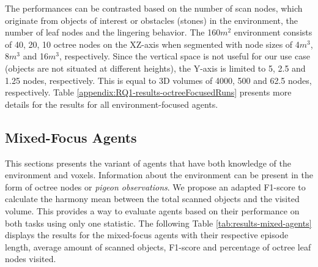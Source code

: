 The performances can be contrasted based on the number of scan nodes, which originate from objects of interest or obstacles (stones) in the environment, the number of leaf nodes and the lingering behavior. 
The 160$m^2$ environment consists of 40, 20, 10 octree nodes on the XZ-axis when segmented with node sizes of 4$m^3$, 8$m^3$ and 16$m^3$, respectively. Since the vertical space is not useful for our use case (objects are not situated at different heights), the Y-axis is limited to 5, 2.5 and 1.25 nodes, respectively. This is equal to 3D volumes of 4000, 500 and 62.5 nodes, respectively.
Table \ref{appendix:RQ1-results-octreeFocusedRuns} presents more details for the results for all environment-focused agents. 
% 




\subsection{Mixed-Focus Agents}
This sections presents the variant of agents that have both knowledge of the environment and voxels. Information about the environment can be present in the form of octree nodes or \textit{pigeon observations}. 
We propose an adapted F1-score \cite{f1score2022} to calculate the harmony mean between the total scanned objects and the visited volume. This provides a way to evaluate agents based on their performance on both tasks using only one statistic. 
The following Table \ref{tab:results-mixed-agents} displays the results for the mixed-focus agents with their respective episode length, average amount of scanned objects, F1-score and percentage of octree leaf nodes visited.

